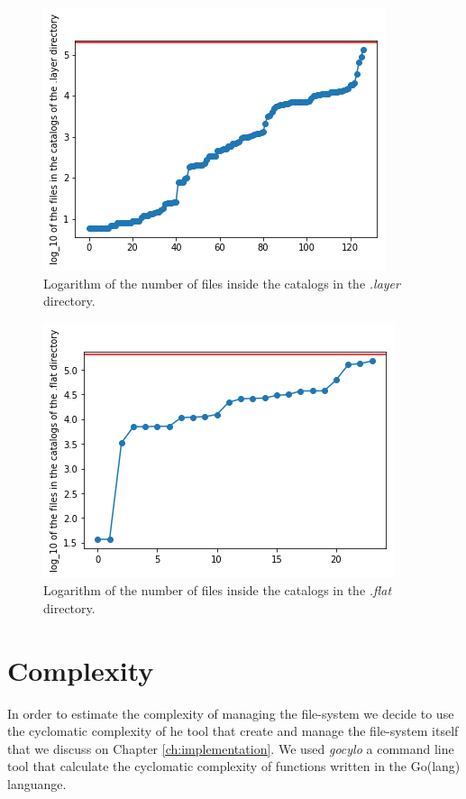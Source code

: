 \begin{figure}[]{}
    \includegraphics[]{gfx/catalogs-layer-log}
        \caption{Logarithm of the number of files inside the catalogs in the \textit{.layer} directory.}
        \label{fig:loglayercatalog}
\end{figure}

\begin{figure}[]{}
    \includegraphics[]{gfx/catalogs-flat-log}
        \caption{Logarithm of the number of files inside the catalogs in the \textit{.flat} directory.}
        \label{fig:logflatcatalog}
\end{figure}

\section{Complexity}

In order to estimate the complexity of managing the file-system we decide to
use the cyclomatic complexity of he tool that create and manage the file-system
itself that we discuss on Chapter \ref{ch:implementation}. We used
\textit{gocylo} \cite{gocylo} a command line tool that calculate the cyclomatic
complexity of functions written in the Go(lang) languange.

